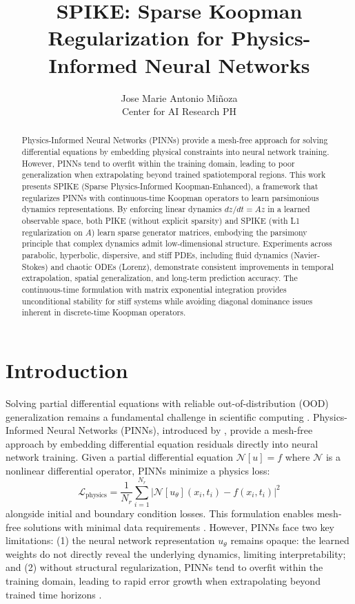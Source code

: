 \documentclass{article}
\title{SPIKE: Sparse Koopman Regularization for Physics-Informed Neural Networks}
\author{%
  Jose Marie Antonio Mi\~noza \\
  Center for AI Research PH
}
\theoremstyle{remark}
\begin{document}
\maketitle

\begin{abstract}
Physics-Informed Neural Networks (PINNs) provide a mesh-free approach for solving differential equations by embedding physical constraints into neural network training. However, PINNs tend to overfit within the training domain, leading to poor generalization when extrapolating beyond trained spatiotemporal regions. This work presents SPIKE (Sparse Physics-Informed Koopman-Enhanced), a framework that regularizes PINNs with continuous-time Koopman operators to learn parsimonious dynamics representations. By enforcing linear dynamics $dz/dt = Az$ in a learned observable space, both PIKE (without explicit sparsity) and SPIKE (with L1 regularization on $A$) learn sparse generator matrices, embodying the parsimony principle that complex dynamics admit low-dimensional structure. Experiments across parabolic, hyperbolic, dispersive, and stiff PDEs, including fluid dynamics (Navier-Stokes) and chaotic ODEs (Lorenz), demonstrate consistent improvements in temporal extrapolation, spatial generalization, and long-term prediction accuracy. The continuous-time formulation with matrix exponential integration provides unconditional stability for stiff systems while avoiding diagonal dominance issues inherent in discrete-time Koopman operators.
\end{abstract}

\section{Introduction}

Solving partial differential equations with reliable out-of-distribution (OOD) generalization remains a fundamental challenge in scientific computing \citep{wang2022pinnsfail}. Physics-Informed Neural Networks (PINNs), introduced by \citet{raissi2019pinn}, provide a mesh-free approach by embedding differential equation residuals directly into neural network training. Given a partial differential equation $\mathcal{N}[u] = f$ where $\mathcal{N}$ is a nonlinear differential operator, PINNs minimize a physics loss:
\begin{equation}
\mathcal{L}_{\text{physics}} = \frac{1}{N_r}\sum_{i=1}^{N_r}\left|\mathcal{N}[u_\theta](x_i, t_i) - f(x_i, t_i)\right|^2
\end{equation}
alongside initial and boundary condition losses. This formulation enables mesh-free solutions with minimal data requirements \citep{raissi2019pinn, wang2021understanding}. However, PINNs face two key limitations: (1) the neural network representation $u_\theta$ remains opaque: the learned weights do not directly reveal the underlying dynamics, limiting interpretability; and (2) without structural regularization, PINNs tend to overfit within the training domain, leading to rapid error growth when extrapolating beyond trained time horizons \citep{wang2022pinnsfail}.
\end{document}
